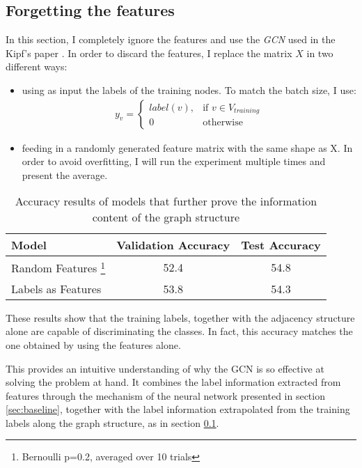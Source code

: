 \documentclass[10pt,a4]{article}
\begin{document}
    \subsection{Forgetting the features}
    \label{sec:labels}
    In this section, I completely ignore the features and use the \emph{GCN}
    used in the Kipf's paper \cite{kipf2016semi}. In order to discard the features, 
    I replace the matrix $X$ in two different ways: 
        \begin{itemize}
            \item using as input the labels of the training nodes. To match the 
        batch size, I use:
            \begin{align*}
                y_v = 
                \begin{cases}
                    label(v), & \text{if } v \in V_{training} \\ 
                    0         & \text{otherwise} 
                \end{cases}
            \end{align*}
            \item feeding in a randomly generated feature matrix with the same 
        shape as X. In order to avoid overfitting, I will run the experiment 
        multiple times and present the average. 
        
        \end{itemize}
        
    \begin{table}[h!]
        \centering
        \begin{tabular}{l c c}
            \textbf{Model} & \textbf{Validation Accuracy} & \textbf{Test Accuracy} \\
            \hline 
            Random Features \footnote{Bernoulli p=0.2, averaged over 10 trials} & 52.4 & 54.8 \\
            Labels as Features & 53.8 & 54.3  
        \end{tabular}
        \caption{Accuracy results of models that further prove the information 
        content of the graph structure}
    \end{table}

    These results show that the training labels, together with the adjacency structure 
    alone are capable of discriminating the classes. In fact, this accuracy matches
    the one obtained by using the features alone.

    This provides an intuitive understanding of why the GCN is so effective 
    at solving the problem at hand. It combines the label information extracted 
    from features through the mechanism of the neural network presented 
    in section \ref{sec:baseline}, together with the label information 
    extrapolated from the training labels along the graph structure, as in 
    section \ref{sec:labels}.
\end{document}
